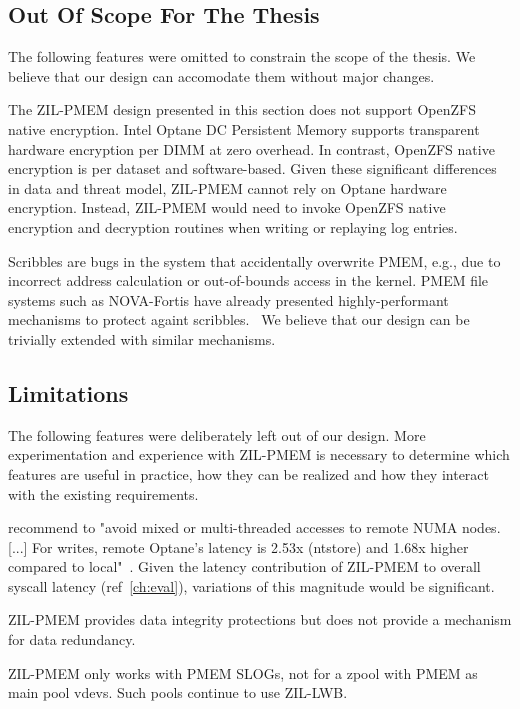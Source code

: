 \documentclass[12pt,a4paper,twoside,draft]{book}
\begin{document}
\subsection{Out Of Scope For The Thesis}
The following features were omitted to constrain the scope of the thesis.
We believe that our design can accomodate them without major changes.

The ZIL-PMEM design presented in this section does not support OpenZFS native encryption.
Intel Optane DC Persistent Memory supports transparent hardware encryption per DIMM at zero overhead.
In contrast, OpenZFS native encryption is per dataset and software-based.
Given these significant differences in data and threat model, ZIL-PMEM cannot rely on Optane hardware encryption.
Instead, ZIL-PMEM would need to invoke OpenZFS native encryption and decryption routines when writing or replaying log entries.

Scribbles are bugs in the system that accidentally overwrite PMEM, e.g., due to incorrect address calculation or out-of-bounds access in the kernel.
PMEM file systems such as NOVA-Fortis have already presented highly-performant mechanisms to protect againt scribbles.~\cite{xu_nova-fortis_2017}
We believe that our design can be trivially extended with similar mechanisms.

\subsection{Limitations}
The following features were deliberately left out of our design.
More experimentation and experience with ZIL-PMEM is necessary to determine which features are useful in practice, how they can be realized and how they interact with the existing requirements.

\citeauthor{yang_empirical_2020} recommend to "avoid mixed or multi-threaded accesses to remote NUMA nodes. [...]  For writes, remote Optane’s latency is 2.53x (ntstore) and 1.68x higher compared to local"~\cite{yang_empirical_2020}.
Given the latency contribution of ZIL-PMEM to overall syscall latency (ref~\ref{ch:eval}), variations of this magnitude would be significant.

ZIL-PMEM provides data integrity protections but does not provide a mechanism for data redundancy.

ZIL-PMEM only works with PMEM SLOGs, not for a zpool with PMEM as main pool vdevs.
Such pools continue to use ZIL-LWB.
\end{document}
